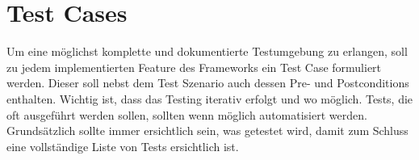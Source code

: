\section{Test Cases}
Um eine m\"oglichst komplette und dokumentierte Testumgebung zu erlangen, soll zu jedem implementierten Feature des Frameworks ein Test Case formuliert werden. Dieser soll nebst dem Test Szenario auch dessen Pre- und Postconditions enthalten.
Wichtig ist, dass das Testing iterativ erfolgt und wo m\"oglich. Tests, die oft ausgef\"uhrt werden sollen, sollten wenn m\"oglich automatisiert werden. Grunds\"atzlich sollte immer ersichtlich sein, was getestet wird, damit zum Schluss eine vollst\"andige Liste von Tests ersichtlich ist.